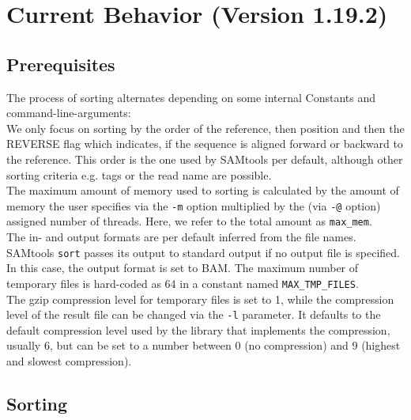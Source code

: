 \section{Current Behavior (Version 1.19.2)}

\subsection{Prerequisites}
The process of sorting alternates depending on some internal Constants and command-line-arguments: \\
We only focus on sorting by the order of the reference, then position and then the REVERSE flag which indicates, if the sequence is aligned forward or backward to the reference. This order is the one used by SAMtools per default, although other sorting criteria e.g. tags or the read name are possible.\\
The maximum amount of memory used to sorting is calculated by the amount of memory the user specifies via the \texttt{-m} option multiplied by the (via \texttt{-@} option) assigned number of threads. Here, we refer to the total amount as \texttt{max\_mem}. \\
The in- and output formats are per default inferred from the file names. \\
SAMtools \texttt{sort} passes its output to standard output if no output file is specified. In this case, the output format is set to BAM.
The maximum number of temporary files is hard-coded as 64 in a constant named \texttt{MAX\_TMP\_FILES}. \\
The gzip compression level for temporary files is set to 1, while the compression level of the result file can be changed via the \texttt{-l} parameter. It defaults to the default compression level used by the library that implements the compression, usually 6, but can be set to a number between 0 (no compression) and 9 (highest and slowest compression).

\subsection{Sorting}

